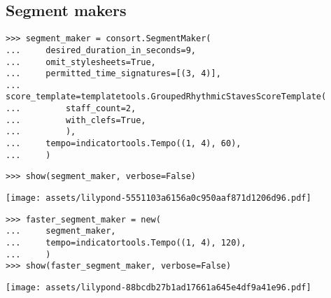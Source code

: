 \subsection{Segment makers}

\begin{comment}
<abjad>
segment_maker = consort.SegmentMaker(
    desired_duration_in_seconds=9,
    omit_stylesheets=True,
    permitted_time_signatures=[(3, 4)],
    score_template=templatetools.GroupedRhythmicStavesScoreTemplate(
        staff_count=2,
        with_clefs=True,
        ),
    tempo=indicatortools.Tempo((1, 4), 60),
    )
</abjad>
\end{comment}

\begin{singlespacing}
\vspace{-0.5\baselineskip}
\begin{lstlisting}
>>> segment_maker = consort.SegmentMaker(
...     desired_duration_in_seconds=9,
...     omit_stylesheets=True,
...     permitted_time_signatures=[(3, 4)],
...     score_template=templatetools.GroupedRhythmicStavesScoreTemplate(
...         staff_count=2,
...         with_clefs=True,
...         ),
...     tempo=indicatortools.Tempo((1, 4), 60),
...     )
\end{lstlisting}
\end{singlespacing}

\begin{comment}
<abjad>[stylesheet=../consort.ily]
show(segment_maker, verbose=False)
</abjad>
\end{comment}

\begin{singlespacing}
\vspace{-0.5\baselineskip}
\begin{lstlisting}
>>> show(segment_maker, verbose=False)
\end{lstlisting}
\noindent\texttt{[image: assets/lilypond-5551103a6156a0c950aaf871d1206d96.pdf]}
\end{singlespacing}

\begin{comment}
<abjad>[stylesheet=../consort.ily]
faster_segment_maker = new(
    segment_maker,
    tempo=indicatortools.Tempo((1, 4), 120),
    )
show(faster_segment_maker, verbose=False)
</abjad>
\end{comment}

\begin{singlespacing}
\vspace{-0.5\baselineskip}
\begin{lstlisting}
>>> faster_segment_maker = new(
...     segment_maker,
...     tempo=indicatortools.Tempo((1, 4), 120),
...     )
>>> show(faster_segment_maker, verbose=False)
\end{lstlisting}
\noindent\texttt{[image: assets/lilypond-88bcdb27b1ad17661a645e4df9a41e96.pdf]}
\end{singlespacing}

